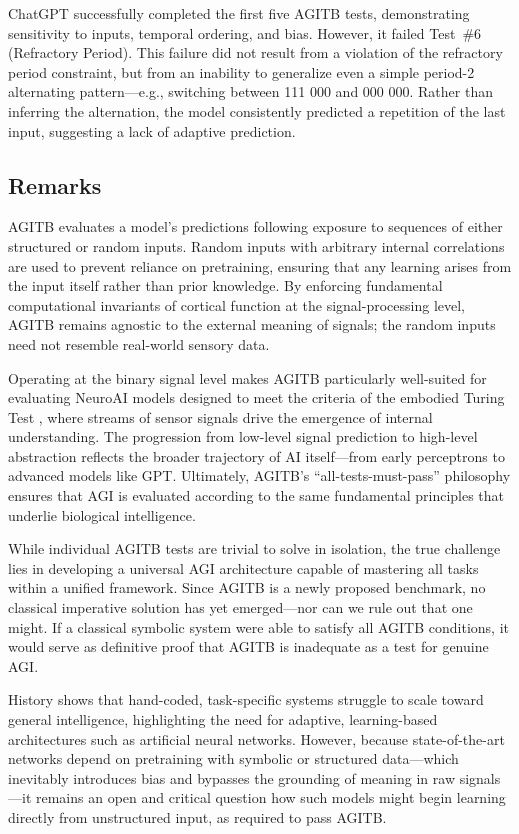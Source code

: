 \documentclass{article}
\begin{document}
	ChatGPT successfully completed the first five AGITB tests, demonstrating sensitivity to inputs, temporal ordering, and bias. However, it failed Test~\#6 (Refractory Period). This failure did not result from a violation of the refractory period constraint, but from an inability to generalize even a simple period-2 alternating pattern—e.g., switching between 111 000 and 000 000. Rather than inferring the alternation, the model consistently predicted a repetition of the last input, suggesting a lack of adaptive prediction.
	
	
	
	\subsection{Remarks}
	
	AGITB evaluates a model’s predictions following exposure to sequences of either structured or random inputs. Random inputs with arbitrary internal correlations are used to prevent reliance on pretraining, ensuring that any learning arises from the input itself rather than prior knowledge. By enforcing fundamental computational invariants of cortical function at the signal-processing level, AGITB remains agnostic to the external meaning of signals; the random inputs need not resemble real-world sensory data.
	
	Operating at the binary signal level makes AGITB particularly well-suited for evaluating NeuroAI models designed to meet the criteria of the embodied Turing Test \cite{Zador2023}, where streams of sensor signals drive the emergence of internal understanding. The progression from low-level signal prediction to high-level abstraction reflects the broader trajectory of AI itself—from early perceptrons to advanced models like GPT. Ultimately, AGITB’s “all-tests-must-pass” philosophy ensures that AGI is evaluated according to the same fundamental principles that underlie biological intelligence.
	
	While individual AGITB tests are trivial to solve in isolation, the true challenge lies in developing a universal AGI architecture capable of mastering all tasks within a unified framework. Since AGITB is a newly proposed benchmark, no classical imperative solution has yet emerged—nor can we rule out that one might. If a classical symbolic system were able to satisfy all AGITB conditions, it would serve as definitive proof that AGITB is inadequate as a test for genuine AGI.
	
	History shows that hand-coded, task-specific systems struggle to scale toward general intelligence, highlighting the need for adaptive, learning-based architectures such as artificial neural networks. However, because state-of-the-art networks depend on pretraining with symbolic or structured data—which inevitably introduces bias and bypasses the grounding of meaning in raw signals—it remains an open and critical question how such models might begin learning directly from unstructured input, as required to pass AGITB.
	
\end{document}
